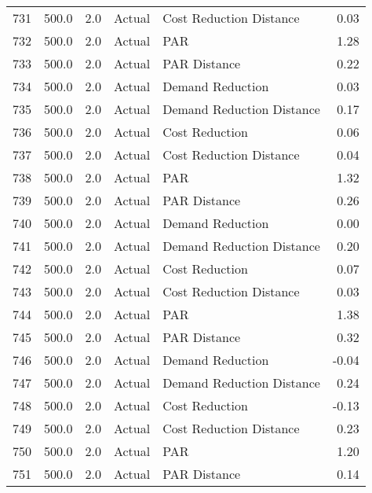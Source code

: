 \begin{longtable}{lrrllr}
731  &        500.0 &     2.0 &         Actual &    Cost Reduction Distance &   0.03 \\
732  &        500.0 &     2.0 &         Actual &                        PAR &   1.28 \\
733  &        500.0 &     2.0 &         Actual &               PAR Distance &   0.22 \\
734  &        500.0 &     2.0 &         Actual &           Demand Reduction &   0.03 \\
735  &        500.0 &     2.0 &         Actual &  Demand Reduction Distance &   0.17 \\
736  &        500.0 &     2.0 &         Actual &             Cost Reduction &   0.06 \\
737  &        500.0 &     2.0 &         Actual &    Cost Reduction Distance &   0.04 \\
738  &        500.0 &     2.0 &         Actual &                        PAR &   1.32 \\
739  &        500.0 &     2.0 &         Actual &               PAR Distance &   0.26 \\
740  &        500.0 &     2.0 &         Actual &           Demand Reduction &   0.00 \\
741  &        500.0 &     2.0 &         Actual &  Demand Reduction Distance &   0.20 \\
742  &        500.0 &     2.0 &         Actual &             Cost Reduction &   0.07 \\
743  &        500.0 &     2.0 &         Actual &    Cost Reduction Distance &   0.03 \\
744  &        500.0 &     2.0 &         Actual &                        PAR &   1.38 \\
745  &        500.0 &     2.0 &         Actual &               PAR Distance &   0.32 \\
746  &        500.0 &     2.0 &         Actual &           Demand Reduction &  -0.04 \\
747  &        500.0 &     2.0 &         Actual &  Demand Reduction Distance &   0.24 \\
748  &        500.0 &     2.0 &         Actual &             Cost Reduction &  -0.13 \\
749  &        500.0 &     2.0 &         Actual &    Cost Reduction Distance &   0.23 \\
750  &        500.0 &     2.0 &         Actual &                        PAR &   1.20 \\
751  &        500.0 &     2.0 &         Actual &               PAR Distance &   0.14 \\

\end{longtable}
